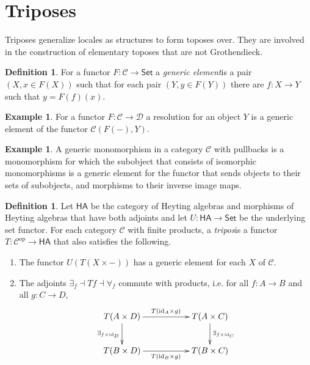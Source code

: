\documentclass[sort&compress,draft]{elsarticle}
\theoremstyle{plain}
\theoremstyle{definition}
\newtheorem{definition}[theorem]{Definition}
\newtheorem{example}[theorem]{Example}
\theoremstyle{remark}
\newcommand\hide[1]{}
\newcommand\key[1]{\emph{#1}\label{#1}}
\newcommand\cat\mathcal
\newcommand\of:
\newcommand\id{\mathrm{id}}
\newcommand\Cat\mathsf
\newcommand\dual{^{op}}
\newcommand\Set{\Cat{Set}}
\begin{document}
\hide{ define equivalence relations for power objects separately. }

\section{Triposes}
Triposes generalize locales as structures to form toposes over. They are involved in the construction of elementary toposes that are not Grothendieck.

\begin{definition}
For a functor $F\of\cat C\to\Set$ a \key{generic element} is a pair $(X,x\in F(X))$ such that for each pair $(Y,y\in F(Y))$ there are $f\of X\to Y$ such that $y = F(f)(x)$. \hide{we can probably recycle this concept dozens of times, in particular as part of the definition of resolvent.}
\end{definition}

\begin{example} For a functor $F\of \cat C\to\cat D$ a resolution for an object $Y$ is a generic element of the functor $\cat C(F(-),Y)$. \end{example}

\begin{example} A generic monomorphism in a category $\cat C$ with pullbacks is a monomorphism for which the subobject that consists of isomorphic monomorphisms is a generic element for the functor that sends objects to their sets of subobjects, and morphisms to their inverse image maps.\end{example}

\begin{definition}
Let $\Cat{HA}$ be the category of Heyting algebras and morphisms of Heyting algebras that have both adjoints and let $U\of\Cat{HA}\to \Set$ be the underlying set functor. For each category $\cat C$ with finite products, a \key{tripos} is a functor $T\of\cat C\dual\to \Cat{HA}$ that also satisfies the following.

\begin{enumerate} 
\item The functor $U(T(X\times -))$ has a generic element for each $X$ of $\cat C$.
\item The adjoints $\exists_f\dashv Tf \dashv \forall_f$ commute with products, i.e. for all $f\of A\to B$ and all $g\of C\to D$,
\[ \xymatrix{
T(A\times D) \ar[rr]^{T(\id_A\times g)} \ar[d]_{\exists_{f\times \id_D}}&& T(A\times C)\ar[d]^{\exists_{f\times \id_C}}\\
T(B\times D) \ar[rr]_{T(\id_B\times g)} && T(B\times C)
}\] 
\end{enumerate}
\end{definition}
\end{document}
